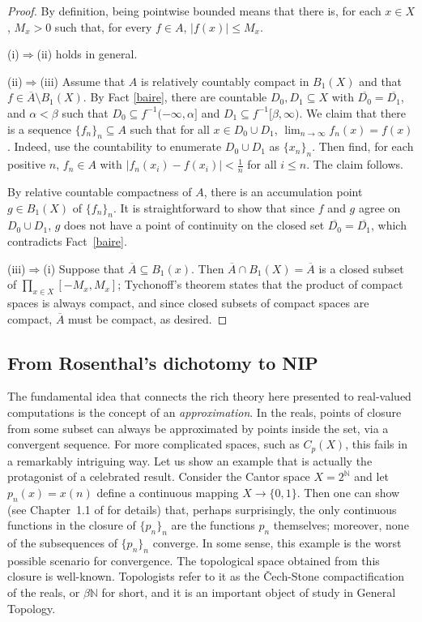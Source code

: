 \documentclass[psamsfonts]{amsart}
\theoremstyle{definition}
\theoremstyle{remark}
\numberwithin{equation}{section}
\begin{document}
\begin{proof}
    By definition, being pointwise bounded means that there is, for each $x\in X$, $M_x>0$ such that, for every $f\in A$, $|f(x)|\leq M_x$.

    (i)$\Rightarrow$(ii) holds in general. 

    (ii)$\Rightarrow$(iii) Assume that $A$ is relatively countably compact in $B_1(X)$ and that $f\in\overline A\setminus B_1(X)$. By Fact \ref{baire}, there are countable $D_0,D_1\subseteq X$ with $\overline {D_0}=\overline{D_1}$, and $\alpha<\beta$ such that $D_0\subseteq f^{-1}(-\infty,\alpha]$ and $D_1\subseteq f^{-1}[\beta,\infty)$. We claim that there is a sequence $\{f_n\}_n\subseteq A$ such that for all $x\in D_0\cup D_1$, $\lim_{n\to\infty}f_n(x)=f(x)$. Indeed, use the countability to enumerate $D_0\cup D_1$ as $\{x_n\}_n$. Then find, for each positive $n$, $f_n\in A$ with $|f_n(x_i)-f(x_i)|<\frac1n$ for all $i\leq n$. The claim follows.

    By relative countable compactness of $A$, there is an accumulation point $g\in B_1(X)$ of $\{f_n\}_n$. It is straightforward to show that since $f$ and $g$ agree on $D_0\cup D_1$, $g$ does not have a point of continuity on the closed set $\overline{D_0}=\overline{D_1}$, which contradicts Fact~\ref{baire}.

    (iii)$\Rightarrow$(i) Suppose that $\overline A\subseteq B_1(x)$. Then $\overline{A}\cap B_1(X)=\overline A$ is a closed subset of $\prod_{x\in X}[-M_x,M_x]$; Tychonoff's theorem states that the product of compact spaces is always compact, and since closed subsets of compact spaces are compact, $\overline A$ must be compact, as desired.
\end{proof}

\subsection{From Rosenthal's dichotomy to NIP}

The fundamental idea that connects the rich theory here presented to real-valued computations is the concept of an \emph{approximation}. In the reals, points of closure from some subset can always be approximated by points inside the set, via a convergent sequence. For more complicated spaces, such as $C_p(X)$, this fails in a remarkably intriguing way. Let us show an example that is actually the protagonist of a celebrated result. Consider the Cantor space $X=2^\mathbb N$ and let $p_n(x)=x(n)$ define a continuous mapping $X\to\{0,1\}$. Then one can show (see Chapter~1.1 of \cite{Todorcevic_1997_TopicsTop} for details) that, perhaps surprisingly, the only continuous functions in the closure of $\{p_n\}_n$ are the functions $p_n$ themselves; moreover, none of the subsequences of $\{p_n\}_n$ converge. In some sense, this example is the worst possible scenario for convergence. The topological space obtained from this closure is well-known. Topologists refer to it as the Čech-Stone compactification of the reals, or $\beta\mathbb N$ for short, and it is an important object of study in General Topology.
\end{document}
